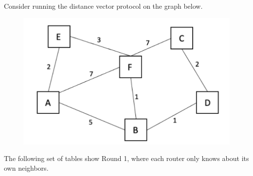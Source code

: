 \documentclass[10pt]{article}
\newenvironment{problem}[2][Problem]{\begin{trivlist}
\item[\hskip \labelsep {\bfseries #1}\hskip \labelsep {\bfseries #2.}]}{\end{trivlist}}
\begin{document}
\begin{problem}{3: Distance Vector Protocol} Consider running the distance vector protocol on the graph below.

\begin{figure}[h]
    \centering
    \includegraphics{figures/dvp_graph.pdf}
    \label{fig:dvp}
\end{figure}

The following set of tables show Round 1, where each router only knows about its own neighbors.


\end{problem}
\end{document}
